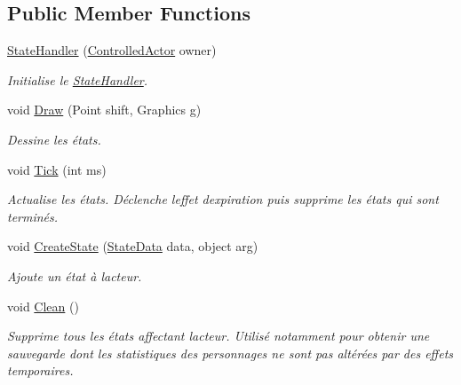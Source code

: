 \subsection*{Public Member Functions}
\begin{DoxyCompactItemize}
\item 
\hyperlink{class_tentacle_slicers_1_1states_1_1_state_handler_aea31ac8accd027f05f500328afdfa23a}{State\+Handler} (\hyperlink{class_tentacle_slicers_1_1actors_1_1_controlled_actor}{Controlled\+Actor} owner)
\begin{DoxyCompactList}\small\item\em Initialise le \hyperlink{class_tentacle_slicers_1_1states_1_1_state_handler}{State\+Handler}. \end{DoxyCompactList}\item 
void \hyperlink{class_tentacle_slicers_1_1states_1_1_state_handler_a8100343390de602cffcdcc3f8adeca17}{Draw} (Point shift, Graphics g)
\begin{DoxyCompactList}\small\item\em Dessine les états. \end{DoxyCompactList}\item 
void \hyperlink{class_tentacle_slicers_1_1states_1_1_state_handler_a007cd3d4ed0d6cef46abac47a512a4bc}{Tick} (int ms)
\begin{DoxyCompactList}\small\item\em Actualise les états. Déclenche l\textquotesingle{}effet d\textquotesingle{}expiration puis supprime les états qui sont terminés. \end{DoxyCompactList}\item 
void \hyperlink{class_tentacle_slicers_1_1states_1_1_state_handler_a9d6aca1bba00b52d21010fa2df0a0397}{Create\+State} (\hyperlink{class_tentacle_slicers_1_1states_1_1_state_data}{State\+Data} data, object arg)
\begin{DoxyCompactList}\small\item\em Ajoute un état à l\textquotesingle{}acteur. \end{DoxyCompactList}\item 
void \hyperlink{class_tentacle_slicers_1_1states_1_1_state_handler_afe7417b5fa0bfa28f30a48b6daacabd9}{Clean} ()
\begin{DoxyCompactList}\small\item\em Supprime tous les états affectant l\textquotesingle{}acteur. Utilisé notamment pour obtenir une sauvegarde dont les statistiques des personnages ne sont pas altérées par des effets temporaires. \end{DoxyCompactList}\end{DoxyCompactItemize}


